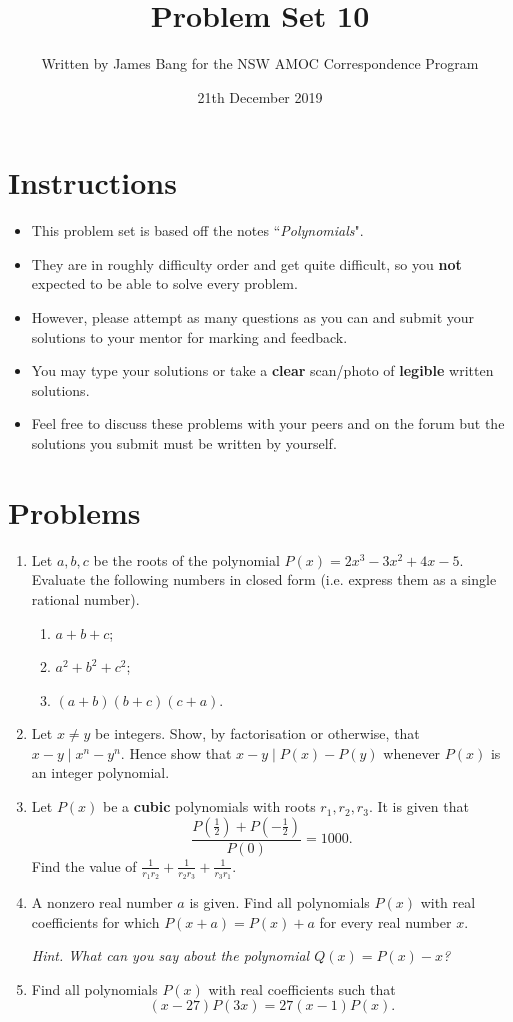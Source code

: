\documentclass[A4 paper]{article}
\title{Problem Set 10}
\author{Written by James Bang for the NSW AMOC Correspondence Program}
\date{21th December 2019}
\begin{document}
 
\maketitle
\thispagestyle{empty}
\section*{Instructions}
\begin{itemize}
\item This problem set is based off the notes ``\textit{Polynomials}". 
\item They are in roughly difficulty order and get quite difficult, so you \textbf{not} expected to be able to solve every problem. 
\item However, please attempt as many questions as you can and submit your solutions to your mentor for marking and feedback.
\item You may type your solutions or take a \textbf{clear} scan/photo of \textbf{legible} written solutions.
\item Feel free to discuss these problems with your peers and on the forum but the solutions you submit must be written by yourself.
\end{itemize}
\section*{Problems}
\begin{enumerate}
	\item Let $a,b,c$ be the roots of the polynomial $P(x)=2x^3-3x^2+4x-5$. Evaluate the following numbers in closed form (i.e. express them as a single rational number).
	\begin{enumerate}
		\item $a+b+c$;
		\item $a^2+b^2+c^2$;
		\item $(a+b)(b+c)(c+a)$.
	\end{enumerate}
	\item Let $x\neq y$ be integers. Show, by factorisation or otherwise, that $x-y\mid x^n-y^n$. Hence show that $x-y\mid P(x)-P(y)$ whenever $P(x)$ is an integer polynomial.
	\item Let $P(x)$ be a \textbf{cubic} polynomials with roots $r_1,r_2,r_3$. It is given that \[\frac{P(\frac{1}{2})+P(-\frac{1}{2})}{P(0)}=1000.\] Find the value of $\frac{1}{r_1r_2}+\frac{1}{r_2r_3}+\frac{1}{r_3r_1}$.
	
	
\item A nonzero real number $a$ is given. Find all polynomials $P(x)$ with real coefficients for which $P(x+a)=P(x)+a$ for every real number $x$.

\vspace{2mm}

\noindent \textit{Hint. What can you say about the polynomial $Q(x)=P(x)-x$?}


\item Find all polynomials $P(x)$ with real coefficients such that \[(x-27)P(3x)=27(x-1)P(x).\]

\end{enumerate}
 
\end{document}
